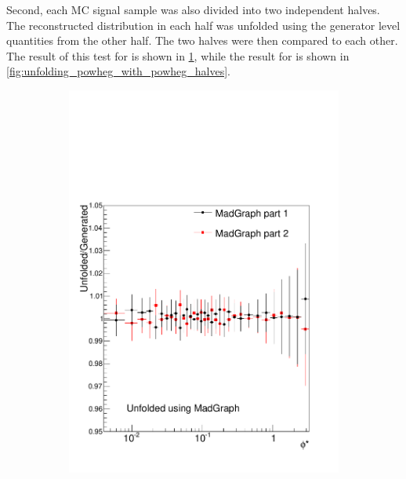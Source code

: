 Second, each MC signal sample was also divided into two independent halves. The
reconstructed \phistar distribution in each half was unfolded using the
generator level quantities from the other half. The two halves were then
compared to each other. The result of this test for \MADGRAPH is shown in
\cref{fig:unfolding_madgraph_with_madgraph_halves}, while the result for
\POWHEG is shown in \cref{fig:unfolding_powheg_with_powheg_halves}.

\begin{figure}[!htbp]
    \centering
    \begin{subfigure}[b]{\SideBySidePlotWidth}
        \includegraphics[width=\textwidth]{figures/BinM_M1M2.pdf}
        \caption{}
        \label{fig:unfolding_madgraph_with_madgraph_halves}
    \end{subfigure}%
    \begin{subfigure}[b]{\SideBySidePlotWidth}

\end{subfigure}
\end{figure}
